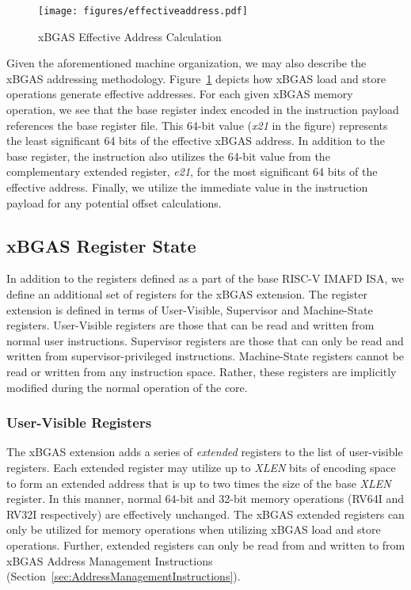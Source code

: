 \documentclass{article}
\begin{document}
\begin{figure}[h!]
\begin{center}
\texttt{[image: figures/effectiveaddress.pdf]}
\caption{xBGAS Effective Address Calculation}
\label{fig:effectiveaddr}
\end{center}
\end{figure}

Given the aforementioned machine organization, we may also describe the xBGAS addressing methodology.  
Figure~\ref{fig:effectiveaddr} depicts how xBGAS load and store operations generate effective addresses.  For each 
given xBGAS memory operation, we see that the base register index encoded in the instruction payload references 
the base register file.  This 64-bit value (\textit{x21} in the figure) represents the least significant 64 bits of the effective 
xBGAS address.  In addition to the base register, the instruction also utilizes the 64-bit value from the complementary 
extended register, \textit{e21}, for the most significant 64 bits of the effective address.  Finally, we utilize the immediate 
value in the instruction payload for any potential offset calculations.

\subsection{xBGAS Register State}
In addition to the registers defined as a part of the base RISC-V IMAFD ISA, we define an additional set of registers for the xBGAS extension.  The register extension is defined in terms of User-Visible, Supervisor and Machine-State registers.  User-Visible registers are those that can be read and written from normal user instructions.  Supervisor registers are those that can only be read and written from supervisor-privileged instructions.  Machine-State registers cannot be read or written from any instruction space.  Rather, these registers are implicitly modified during the normal operation of the core.     

\subsubsection{User-Visible Registers} 
The xBGAS extension adds a series of \emph{extended} registers to the list of user-visible registers.  Each extended register may utilize 
up to \textit{XLEN} bits of encoding space to form an extended address that is up to two times the size of the base \textit{XLEN} register.  
In this manner, normal 64-bit and 32-bit memory operations (RV64I and RV32I respectively) are effectively unchanged.  The xBGAS extended registers can only be utilized for memory operations when utilizing xBGAS load and store operations.  Further, extended registers can only be read from and written to from xBGAS Address Management Instructions (Section~\ref{sec:AddressManagementInstructions}).   
\end{document}
